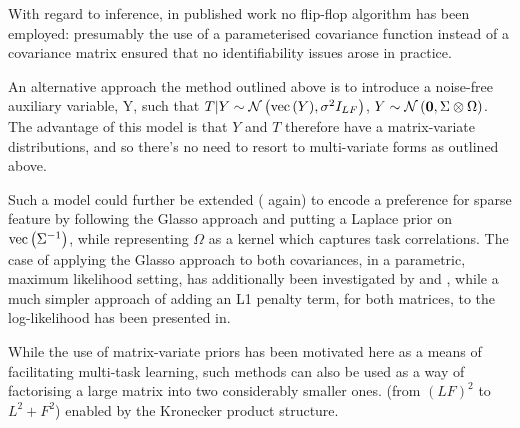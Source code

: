 With regard to inference, in published work\cite{Bonilla2008} no flip-flop algorithm has been employed: presumably the use of a parameterised covariance function instead of a covariance matrix ensured that no identifiability issues arose in practice.



An alternative approach the method outlined above is to introduce a noise-free auxiliary variable, Y, such that $T|Y\sim\mathcal{N} \left( {\text{vec}\left(Y\right)}, {\sigma^2 I_{LF}} \right)$, $Y\sim\mathcal{N} \left( {\bm 0}, {\Sigma \otimes \Omega} \right)$\cite{Stegle2011}. The advantage of this model is that $Y$ and $T$ therefore have a matrix-variate distributions, and so there's no need to resort to multi-variate forms as outlined above. 

Such a model could further be extended (\cite{Stegle2011} again) to encode a preference for sparse feature by following the Glasso approach\cite{Friedman2008} and putting a Laplace prior on $\text{vec}\left({\Sigma}^{-1}\right)$, while representing $\Omega$ as a kernel which captures task correlations. The case of applying the Glasso approach to both covariances, in a parametric, maximum likelihood setting, has additionally been investigated by \cite{Tsiligkaridis2012b} and \cite{Tsiligkaridis2012}, while a much simpler approach of adding an L1 penalty term, for both matrices, to the log-likelihood has been presented in\cite{Zhang2010a}.


While the use of matrix-variate priors has been motivated here as a means of facilitating multi-task learning, such methods can also be used as a way of factorising a large matrix into two considerably smaller ones. (from $(LF)^2$ to $L^2 + F^2$) enabled by the Kronecker product structure.

